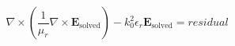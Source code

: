 \begin{equation}
    \nabla\times\left(\frac{1}{\mu_r}\nabla\times\mathbf{E}_{\mathrm{solved}}\right)-k_0^2\epsilon_r\mathbf{E}_{\mathrm{solved}}=residual
    \label{eqn:full_wave_equation_solved}
\end{equation}







